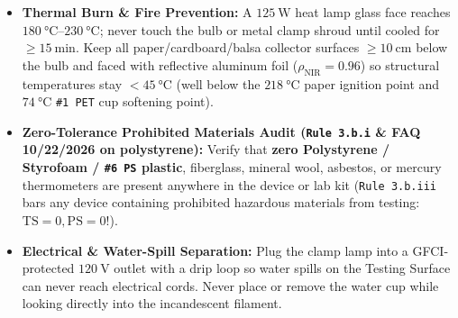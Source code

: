 \begin{rulebox}
\begin{itemize}
  \item \textbf{Thermal Burn \& Fire Prevention:} A $\SI{125}{\watt}$ heat lamp glass face reaches $\SIrange{180}{230}{\celsius}$; never touch the bulb or metal clamp shroud until cooled for $\ge\SI{15}{\minute}$. Keep all paper/cardboard/balsa collector surfaces $\ge\SI{10}{\centi\meter}$ below the bulb and faced with reflective aluminum foil ($\rho_{\mathrm{NIR}} = 0.96$) so structural temperatures stay $<\SI{45}{\celsius}$ (well below the $\SI{218}{\celsius}$ paper ignition point and $\SI{74}{\celsius}$ \texttt{\#1 PET} cup softening point).
  \item \textbf{Zero-Tolerance Prohibited Materials Audit (\texttt{Rule 3.b.i} \& FAQ 10/22/2026 on polystyrene):} Verify that \textbf{zero Polystyrene / Styrofoam / \texttt{\#6 PS} plastic}, fiberglass, mineral wool, asbestos, or mercury thermometers are present anywhere in the device or lab kit (\texttt{Rule 3.b.iii} bars any device containing prohibited hazardous materials from testing: $\mathrm{TS}=0, \mathrm{PS}=0$!).
  \item \textbf{Electrical \& Water-Spill Separation:} Plug the clamp lamp into a GFCI-protected $\SI{120}{\volt}$ outlet with a drip loop so water spills on the Testing Surface can never reach electrical cords. Never place or remove the water cup while looking directly into the incandescent filament.
\end{itemize}
\end{rulebox}

